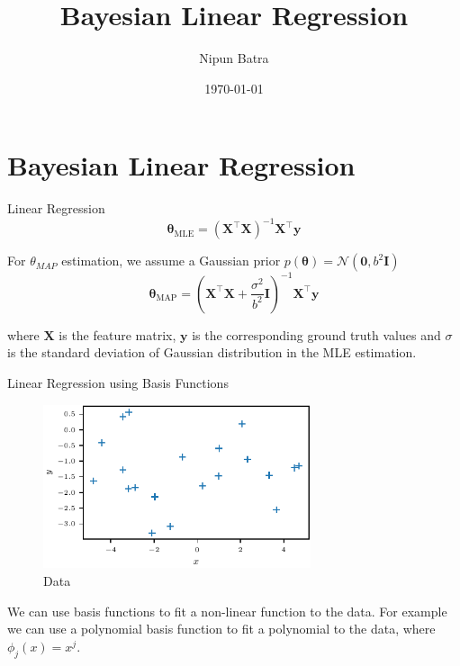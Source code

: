 \documentclass{beamer}
\begin{document}
    



\title{Bayesian Linear Regression}
\author{Nipun Batra}
\date{\today}
\maketitle
{}

\section{Bayesian Linear Regression}

\begin{frame}{Linear Regression}
\begin{equation*}
\boldsymbol{\theta}_{\mathrm{MLE}}=\left(\boldsymbol{X}^{\top} \boldsymbol{X}\right)^{-1} \boldsymbol{X}^{\top} \boldsymbol{y}
\end{equation*}

\pause For $\theta_{MAP}$ estimation, we assume a Gaussian prior $p(\boldsymbol{\theta})=\mathcal{N}\left(\mathbf{0}, b^2 \boldsymbol{I}\right)$\\
\pause \begin{equation*}
\boldsymbol{\theta}_{\mathrm{MAP}}=\left(\boldsymbol{X}^{\top} \boldsymbol{X}+\frac{\sigma^2}{b^2} \boldsymbol{I}\right)^{-1} \boldsymbol{X}^{\top} \boldsymbol{y}
\end{equation*}

\pause where $\boldsymbol{X}$ is the feature matrix, $\boldsymbol{y}$ is the corresponding ground truth values and $\sigma$ is the standard deviation of Gaussian distribution in the MLE estimation. 

\end{frame}

\begin{frame}{Linear Regression using Basis Functions}
    \begin{figure}
        \centering
        \includegraphics[width=0.7\textwidth]{data.pdf}
        \caption{Data}
    \end{figure}
    \pause We can use basis functions to fit a non-linear function to the data.
    \pause For example we can use a polynomial basis function to fit a polynomial to the data, where $\phi_j(x)=x^j$.
\end{frame}
\end{document}
